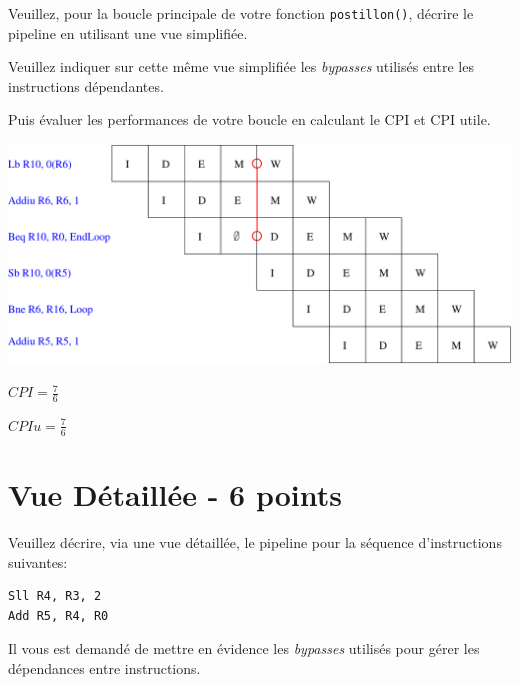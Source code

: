 Veuillez, pour la boucle principale de votre fonction \texttt{postillon()},
d\'ecrire le pipeline en utilisant une vue simplifi\'ee.

Veuillez indiquer sur cette m\^eme vue simplifi\'ee les \textit{bypasses}
utilis\'es entre les instructions d\'ependantes.

Puis \'evaluer les performances de votre boucle en calculant le CPI et CPI
utile.

\begin{correction}

  \begin{center}
    \includegraphics[scale=0.8]{figures/correction-vue-simplifiee.pdf}

    \begin{math}
      CPI = \frac{7}{6}
    \end{math}

    \begin{math}
      CPIu = \frac{7}{6}
    \end{math}
  \end{center}

\end{correction}

%
%

\section{Vue D\'etaill\'ee - 6 points}

Veuillez d\'ecrire, via une vue d\'etaill\'ee, le pipeline pour la s\'equence
d'instructions suivantes:

\begin{verbatim}
Sll R4, R3, 2
Add R5, R4, R0
\end{verbatim}

Il vous est demand\'e de mettre en \'evidence les \textit{bypasses} utilis\'es
pour g\'erer les d\'ependances entre instructions.

